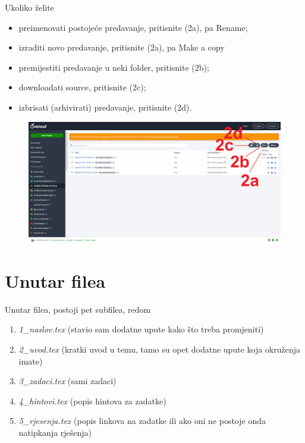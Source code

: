     Ukoliko želite
    
    \begin{itemize}
        \item preimenovati postojeće predavanje, pritisnite \textsf{(2a)}, pa \textsf{Rename};
        \item izraditi novo predavanje, pritisnite \textsf{(2a)}, pa \textsf{Make a copy}
        \item premijestiti predavanje u neki folder, pritisnite \textsf{(2b)};
        \item downloadati source, pritisnite \textsf{(2c)};
        \item izbrisati (arhivirati) predavanje, pritisnite \textsf{(2d)}.
    \end{itemize}
    
    \begin{figure}[h]
        \centering
        \includegraphics[width = \textwidth]{images/Primjer_2.png}
    \end{figure}
    
\newpage
    
    \section{Unutar filea}
    
    Unutar filea, postoji pet subfilea, redom
    \begin{enumerate}
        \item \textit{1\_naslov.tex} (stavio sam dodatne upute kako što treba promjeniti)
        \item \textit{2\_uvod.tex} (kratki uvod u temu, tamo su opet dodatne upute koja okruženja imate)
        \item \textit{3\_zadaci.tex} (sami zadaci)
        \item \textit{4\_hintovi.tex} (popis hintova za zadatke)
        \item \textit{5\_rjesenja.tex} (popis linkova na zadatke ili ako oni ne postoje onda natipkanja rješenja)
    \end{enumerate}
    
